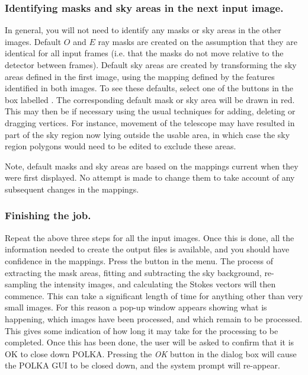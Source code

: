 \documentclass[11pt,nolof]{starlink}
\providecommand{\mylabel}[1] {\xlabel{#1}\label{#1}}
\begin{document}
\subsubsection {\mylabel{TUT_NEXT_MASK}Identifying masks and sky areas in the next input image.}
In general, you will not need to identify any masks or sky areas in the
other images. Default $O$ and $E$ ray masks are created on the assumption
that they are identical for all input frames (i.e. that the masks do not
move relative to the detector between frames). Default sky areas are
created by transforming the sky areas defined in the first image, using
the mapping defined by the features identified in both images. To see
these defaults, select one of the buttons in the box labelled
. The corresponding default mask
or sky area will be drawn in red. This may then be
 if necessary using the
usual techniques for adding, deleting or dragging vertices. For instance,
movement of the telescope may have resulted in part of the sky region now
lying outside the usable area, in which case the sky region polygons would
need to be edited to exclude these areas.

Note, default masks and sky areas are based on the mappings current when
they were first displayed. No attempt is made to change them to take
account of any subsequent changes in the mappings.

\subsubsection {Finishing the job.}
Repeat the above three steps for all the input images. Once this is done,
all the information needed to create the output files is available, and
you should have confidence in the mappings. Press the  button in the 
menu. The process of extracting the mask areas, fitting and subtracting
the sky background, re-sampling the intensity images, and calculating the
Stokes vectors will then commence. This can take a significant length of
time for anything other than very small images. For this reason a pop-up
window appears showing what is happening, which images have been
processed, and which remain to be processed. This gives some indication
of how long it may take for the processing to be completed. Once this has
been done, the user will be asked to confirm that it is OK to close down
POLKA. Pressing the \emph{OK} button in the dialog box will cause the
POLKA GUI to be closed down, and the system prompt will re-appear.
\end{document}
